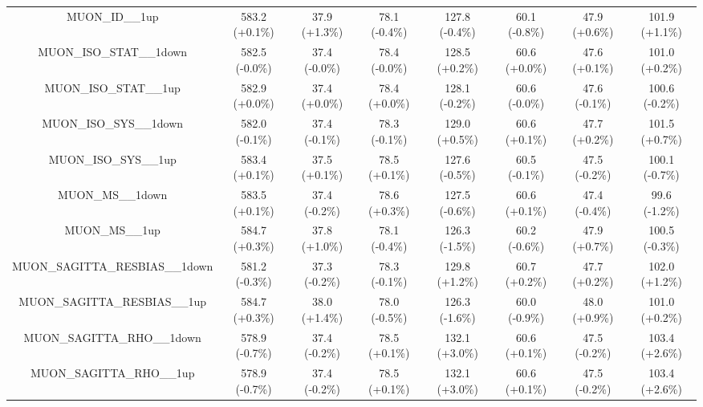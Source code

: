 \begin{table}[htbp!]
\begin{tiny}
\begin{center}
\begin{tabular}{c|c|c|c||c|c|c|c}
MUON\_ID\_\_1up                                              & 583.2     (+0.1\%) & 37.9      (+1.3\%) & 78.1      (-0.4\%) & 127.8     (-0.4\%) & 60.1      (-0.8\%) & 47.9      (+0.6\%) & 101.9     (+1.1\%) \\ 
MUON\_ISO\_STAT\_\_1down                                     & 582.5     (-0.0\%) & 37.4      (-0.0\%) & 78.4      (-0.0\%) & 128.5     (+0.2\%) & 60.6      (+0.0\%) & 47.6      (+0.1\%) & 101.0     (+0.2\%) \\ 
MUON\_ISO\_STAT\_\_1up                                       & 582.9     (+0.0\%) & 37.4      (+0.0\%) & 78.4      (+0.0\%) & 128.1     (-0.2\%) & 60.6      (-0.0\%) & 47.6      (-0.1\%) & 100.6     (-0.2\%) \\ 
MUON\_ISO\_SYS\_\_1down                                      & 582.0     (-0.1\%) & 37.4      (-0.1\%) & 78.3      (-0.1\%) & 129.0     (+0.5\%) & 60.6      (+0.1\%) & 47.7      (+0.2\%) & 101.5     (+0.7\%) \\ 
MUON\_ISO\_SYS\_\_1up                                        & 583.4     (+0.1\%) & 37.5      (+0.1\%) & 78.5      (+0.1\%) & 127.6     (-0.5\%) & 60.5      (-0.1\%) & 47.5      (-0.2\%) & 100.1     (-0.7\%) \\ 
MUON\_MS\_\_1down                                            & 583.5     (+0.1\%) & 37.4      (-0.2\%) & 78.6      (+0.3\%) & 127.5     (-0.6\%) & 60.6      (+0.1\%) & 47.4      (-0.4\%) & 99.6      (-1.2\%) \\ 
MUON\_MS\_\_1up                                              & 584.7     (+0.3\%) & 37.8      (+1.0\%) & 78.1      (-0.4\%) & 126.3     (-1.5\%) & 60.2      (-0.6\%) & 47.9      (+0.7\%) & 100.5     (-0.3\%) \\ 
MUON\_SAGITTA\_RESBIAS\_\_1down                              & 581.2     (-0.3\%) & 37.3      (-0.2\%) & 78.3      (-0.1\%) & 129.8     (+1.2\%) & 60.7      (+0.2\%) & 47.7      (+0.2\%) & 102.0     (+1.2\%) \\ 
MUON\_SAGITTA\_RESBIAS\_\_1up                                & 584.7     (+0.3\%) & 38.0      (+1.4\%) & 78.0      (-0.5\%) & 126.3     (-1.6\%) & 60.0      (-0.9\%) & 48.0      (+0.9\%) & 101.0     (+0.2\%) \\ 
MUON\_SAGITTA\_RHO\_\_1down                                  & 578.9     (-0.7\%) & 37.4      (-0.2\%) & 78.5      (+0.1\%) & 132.1     (+3.0\%) & 60.6      (+0.1\%) & 47.5      (-0.2\%) & 103.4     (+2.6\%) \\ 
MUON\_SAGITTA\_RHO\_\_1up                                    & 578.9     (-0.7\%) & 37.4      (-0.2\%) & 78.5      (+0.1\%) & 132.1     (+3.0\%) & 60.6      (+0.1\%) & 47.5      (-0.2\%) & 103.4     (+2.6\%) \\ 

\end{tabular}
\end{center}
\end{tiny}
\end{table}
